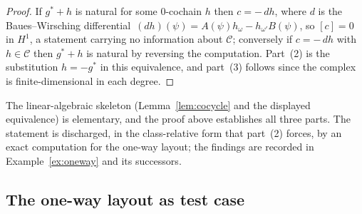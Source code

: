 \documentclass[11pt,a4paper]{article}
\theoremstyle{plain}
\theoremstyle{definition}
\theoremstyle{remark}
\begin{document}
\begin{proof}
If $g^{*}+h$ is natural for some $0$-cochain $h$ then $c = -\,d h$, where $d$
is the Baues--Wirsching differential $\,(d h)(\psi) = A(\psi) h_\omega -
h_{\omega'} B(\psi)$, so $[c]=0$ in $H^{1}$, a statement carrying no
information about $\mathcal{C}$; conversely if $c = -\,d h$ with
$h \in \mathcal{C}$ then $g^* + h$ is natural by reversing the computation.
Part~(2) is the
substitution $h = -g^{*}$ in this equivalence, and part~(3) follows since the
complex is finite-dimensional in each degree.
\end{proof}

The linear-algebraic skeleton (Lemma~\ref{lem:cocycle} and the displayed
equivalence) is elementary, and the proof above establishes all three parts.
The statement is discharged, in the class-relative form that part~(2) forces, by
an exact computation for the one-way layout; the findings
are recorded in Example~\ref{ex:oneway} and its successors.

\subsection{The one-way layout as test case}
\end{document}

